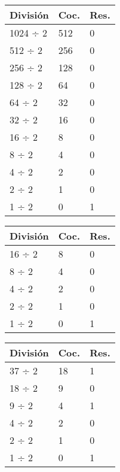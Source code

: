 \documentclass[12pt]{article}
\begin{document}
\begin{table}[H]
\centering
\begin{minipage}[t]{0.32\textwidth}
\centering
\begin{tabular}{lll}
\toprule
\textbf{División} & \textbf{Coc.} & \textbf{Res.} \\
\midrule
1024 ÷ 2 & 512 & 0 \\
512 ÷ 2  & 256 & 0 \\
256 ÷ 2  & 128 & 0 \\
128 ÷ 2  & 64  & 0 \\
64 ÷ 2   & 32  & 0 \\
32 ÷ 2   & 16  & 0 \\
16 ÷ 2   & 8   & 0 \\
8 ÷ 2    & 4   & 0 \\
4 ÷ 2    & 2   & 0 \\
2 ÷ 2    & 1   & 0 \\
1 ÷ 2    & 0   & 1 \\
\bottomrule
\end{tabular}
\end{minipage}
\hfill
\begin{minipage}[t]{0.32\textwidth}
\centering
\begin{tabular}{lll}
\toprule
\textbf{División} & \textbf{Coc.} & \textbf{Res.} \\
\midrule
16 ÷ 2 & 8 & 0 \\
8 ÷ 2  & 4 & 0 \\
4 ÷ 2  & 2 & 0 \\
2 ÷ 2  & 1 & 0 \\
1 ÷ 2  & 0 & 1 \\
\bottomrule
\end{tabular}
\end{minipage}
\hfill
\begin{minipage}[t]{0.32\textwidth}
\centering
\begin{tabular}{lll}
\toprule
\textbf{División} & \textbf{Coc.} & \textbf{Res.} \\
\midrule
37 ÷ 2 & 18 & 1 \\
18 ÷ 2 & 9  & 0 \\
9 ÷ 2  & 4  & 1 \\
4 ÷ 2  & 2  & 0 \\
2 ÷ 2  & 1  & 0 \\
1 ÷ 2  & 0  & 1 \\
\bottomrule
\end{tabular}
\end{minipage}
\end{table}
\end{document}

